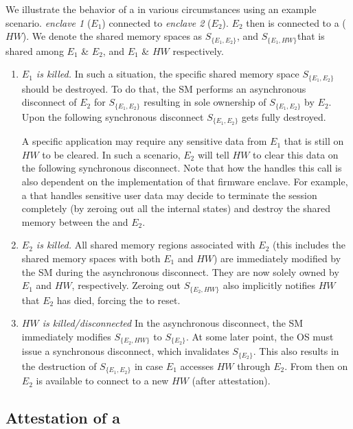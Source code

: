We illustrate the behavior of a \nameenclave{} in various circumstances using an example scenario. \emph{enclave 1} ($E_1$) connected to \emph{enclave 2} ($E_2$). $E_2$ then is connected to a \sphw ($HW$). We denote the shared memory spaces as $S_{\{E_1, E_2\}}$, and $S_{\{E_1, HW\}}$that is shared among $E_1$ \& $E_2$, and $E_1$ \& $HW$ respectively.

\begin{enumerate}

\item\emph{$E_1$ is killed.} In such a situation, the specific shared memory space $S_{\{E_1, E_2\}}$ should be destroyed. To do that, the SM performs an asynchronous disconnect of $E_2$ for $S_{\{E_1, E_2\}}$ resulting in sole ownership of $S_{\{E_1, E_2\}}$ by $E_2$. Upon the following synchronous disconnect $S_{\{E_1, E_2\}}$ gets fully destroyed.

A specific application may require any sensitive data from $E_1$ that is still on $HW$ to be cleared. In such a scenario, $E_2$ will tell $HW$ to clear this data on the following synchronous disconnect. Note that how the \sphw handles this call is also dependent on the implementation of that \sphw firmware enclave. For example, a \sphw that handles sensitive user data may decide to terminate the session completely (by zeroing out all the internal states) and destroy the shared memory between the \sphw and $E_2$.

    
\item\emph{$E_2$ is killed.} All shared memory regions associated with $E_2$ (this includes the shared memory spaces with both $E_1$ and $HW$) are immediately modified by the SM during the asynchronous disconnect. They are now solely owned by $E_1$ and $HW$, respectively. Zeroing out $S_{\{E_2, HW\}}$ also implicitly notifies $HW$ that $E_2$ has died, forcing the \sphw to reset.
    
\item\emph{$HW$ is killed/disconnected} In the asynchronous disconnect, the SM immediately modifies $S_{\{E_2, HW\}}$ to $S_{\{E_2\}}$. At some later point, the OS must issue a synchronous disconnect, which invalidates $S_{\{E_2\}}$. This also results in the destruction of $S_{\{E_1, E_2\}}$ in case $E_1$ accesses $HW$ through $E_2$. From then on $E_2$ is available to connect to a new $HW$ (after attestation).

\end{enumerate}

\subsection{Attestation of a \nameenclave{}}
\label{sec:approach:attestation}

